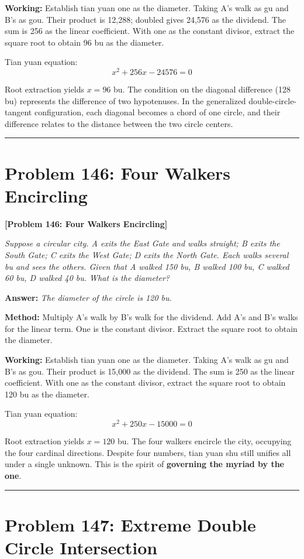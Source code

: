 \documentclass[11pt,a4paper]{book}
\newcommand{\answer}[1]{\noindent\textbf{\color{anacolor}Answer: }\textit{#1}\par}
\newcommand{\method}[1]{\noindent\textbf{\color{methodcolor}Method: }#1\par}
\newcommand{\working}[1]{\noindent\textbf{\color{workcolor}Working: }#1\par}
\newcommand{\shortline}{\noindent\rule{0.5\textwidth}{0.4pt}\par}
\begin{document}
\working{Establish tian yuan one as the diameter. Taking A's walk as gu and B's as gou. Their product is 12,288; doubled gives 24,576 as the dividend. The sum is 256 as the linear coefficient. With one as the constant divisor, extract the square root to obtain 96 bu as the diameter.

Tian yuan equation:
$$x^2 + 256x - 24576 = 0$$

Root extraction yields $x = 96$ bu. The condition on the diagonal difference (128 bu) represents the difference of two hypotenuses. In the generalized double-circle-tangent configuration, each diagonal becomes a chord of one circle, and their difference relates to the distance between the two circle centers.}

\shortline

\section{Problem 146: Four Walkers Encircling}
\label{sec:prob146}

\noindent\textbf{\color{probcolor}[Problem 146: Four Walkers Encircling]}

\textit{Suppose a circular city. A exits the East Gate and walks straight; B exits the South Gate; C exits the West Gate; D exits the North Gate. Each walks several bu and sees the others. Given that A walked 150 bu, B walked 100 bu, C walked 60 bu, D walked 40 bu. What is the diameter?}

\answer{The diameter of the circle is 120 bu.}

\method{Multiply A's walk by B's walk for the dividend. Add A's and B's walks for the linear term. One is the constant divisor. Extract the square root to obtain the diameter.}

\working{Establish tian yuan one as the diameter. Taking A's walk as gu and B's as gou. Their product is 15,000 as the dividend. The sum is 250 as the linear coefficient. With one as the constant divisor, extract the square root to obtain 120 bu as the diameter.

Tian yuan equation:
$$x^2 + 250x - 15000 = 0$$

Root extraction yields $x = 120$ bu. The four walkers encircle the city, occupying the four cardinal directions. Despite four numbers, tian yuan shu still unifies all under a single unknown. This is the spirit of \textbf{governing the myriad by the one}.}

\shortline

\section{Problem 147: Extreme Double Circle Intersection}
\label{sec:prob147}
\end{document}
